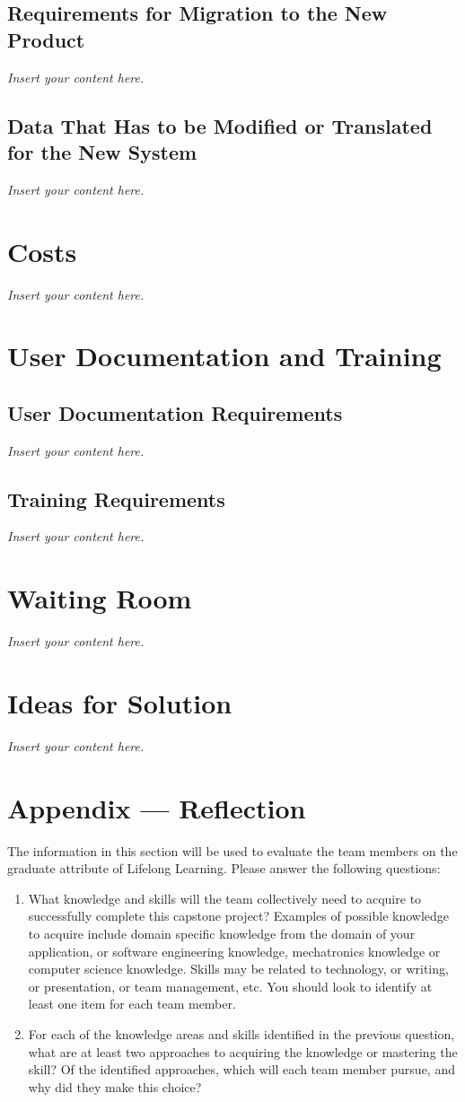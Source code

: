 \documentclass[12pt]{article}
\newcommand{\lips}{\textit{Insert your content here.}}
\begin{document}
\subsection{Requirements for Migration to the New Product}
\lips
\subsection{Data That Has to be Modified or Translated for the New System}
\lips

\section{Costs}
\lips
\section{User Documentation and Training}
\subsection{User Documentation Requirements}
\lips
\subsection{Training Requirements}
\lips

\section{Waiting Room}
\lips

\section{Ideas for Solution}
\lips

\newpage{}
\section*{Appendix --- Reflection}

The information in this section will be used to evaluate the team members on the
graduate attribute of Lifelong Learning.  Please answer the following questions:

\begin{enumerate}
  \item What knowledge and skills will the team collectively need to acquire to
  successfully complete this capstone project?  Examples of possible knowledge
  to acquire include domain specific knowledge from the domain of your
  application, or software engineering knowledge, mechatronics knowledge or
  computer science knowledge.  Skills may be related to technology, or writing,
  or presentation, or team management, etc.  You should look to identify at
  least one item for each team member.
  \item For each of the knowledge areas and skills identified in the previous
  question, what are at least two approaches to acquiring the knowledge or
  mastering the skill?  Of the identified approaches, which will each team
  member pursue, and why did they make this choice?
\end{enumerate}
\end{document}
